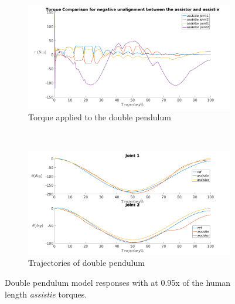 \begin{figure}[h!]
    \centering
    \begin{subfigure}{0.5\textwidth}
        \centering
        \includegraphics[width=\linewidth]{images/controllers/small_length_torque.png}
        \caption[Double Pendulum: Negative Alignment-Effort]{Torque applied to the double pendulum}
        \label{fig:small_length_torque}
    \end{subfigure}%
    ~
    \begin{subfigure}{0.5\textwidth}
        \centering
        \includegraphics[width=\linewidth]{images/controllers/small_length_traj.png}
        \caption[Double Pendulum: Negative Alignment-Trajectory]{Trajectories of double pendulum}
        \label{fig:small_length_traj}
    \end{subfigure}
    \caption[Double Pendulum: Negative Alignment]{Double pendulum model responses with at 0.95x of the human length \textit{assistie} torques.}
    \label{fig:small_length}
\end{figure}

